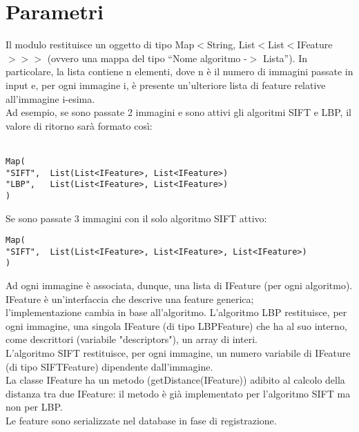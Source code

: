 \chapter{Parametri}
Il modulo restituisce un oggetto di tipo Map$<$String, List$<$List$<$IFeature$>>>$ (ovvero una mappa del tipo ``Nome algoritmo -$>$ Lista''). In particolare, la lista contiene n elementi, dove n è il numero di immagini passate in input e, per ogni immagine i, è presente un'ulteriore lista di feature relative all'immagine i-esima.\\
Ad esempio, se sono passate 2 immagini e sono attivi gli algoritmi SIFT e LBP, il valore di ritorno sarà formato così:\\\\

\begin{lstlisting}
Map(
"SIFT",  List(List<IFeature>, List<IFeature>)
"LBP",   List(List<IFeature>, List<IFeature>)
)
\end{lstlisting}
\vspace{0.4cm}
Se sono passate 3 immagini con il solo algoritmo SIFT attivo:\\
\begin{lstlisting}
Map(
"SIFT",  List(List<IFeature>, List<IFeature>, List<IFeature>)
)
\end{lstlisting}
\vspace{0.8cm}
Ad ogni immagine è associata, dunque, una lista di IFeature (per ogni algoritmo). IFeature è un'interfaccia che descrive una feature generica;\\ l'implementazione cambia in base all'algoritmo. 
L'algoritmo LBP restituisce, per ogni immagine, una singola IFeature (di tipo LBPFeature) che ha al suo interno, come descrittori (variabile "descriptors"), un array di interi.\\
L'algoritmo SIFT restituisce, per ogni immagine, un numero variabile di IFeature (di tipo SIFTFeature) dipendente dall'immagine.\\
La classe IFeature ha un metodo (getDistance(IFeature)) adibito al calcolo della distanza tra due IFeature: il metodo è già implementato per l'algoritmo SIFT ma non per LBP.\\
Le feature sono serializzate nel database in fase di registrazione.\\